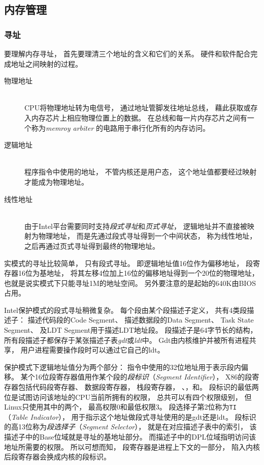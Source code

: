 \subsection{内存管理}

\subsubsection{寻址}
要理解内存寻址，
首先要理清三个地址的含义和它们的关系。
硬件和软件配合完成地址之间映射的过程。
\begin{description}
\item[物理地址] \hfill\\
  CPU将物理地址转为电信号，
  通过地址管脚发往地址总线，
  藉此获取或存入内存芯片上相应物理位置上的数据。
  在总线和每一片内存芯片之间有一个称为{\em memroy arbiter}
  的电路用于串行化所有的内存访问。
\item[逻辑地址] \hfill\\
  程序指令中使用的地址，
  不管内核还是用户态，
  这个地址值都要经过映射才能成为物理地址。
\item[线性地址] \hfill\\
  由于Intel平台需要同时支持{\em 段式寻址}和{\em 页式寻址}，
  逻辑地址并不直接被映射为物理地址，
  而是先通过段式寻址得到一个中间状态，
  称为线性地址，
  之后再通过页式寻址得到最终的物理地址。
\end{description}
实模式的寻址比较简单，
只有段式寻址。
即逻辑地址值16位作为偏移地址，
段寄存器16位为基地址，
将其左移4位加上16位的偏移地址得到一个20位的物理地址，
也就是说实模式下只能寻址1M的地址空间。
另外要注意的是起始的640K由BIOS占用。

Intel保护模式的段式寻址稍微复杂。
每个段由某个段描述子定义，
共有4类段描述子：
描述代码段的Code Segment、
描述数据段的Data Segment、
Task State Segment、
及LDT Segment用于描述LDT地址段。
段描述子是64字节长的结构，
所有段描述子都保存于某张描述子表{\em gdt}或{\em ldt}中。
Gdt由内核维护并被所有进程共享，
用户进程需要操作段时可以通过它自己的ldt。

保护模式下逻辑地址值分为两个部分：
指令中使用的32位地址用于表示段内偏移。
某个16位段寄存器值用作某个段的{\em 段标识}（{\em Segment Identifier}），
X86的段寄存器包括代码段寄存器、
数据段寄存器，
栈段寄存器，
、，和。
段标识的最低两位是试图访问该地址的CPU当前所拥有的权限，
总共可以有四个权限级别，
但Linux只使用其中的两个，
最高权限0和最低权限3。
段选择子第2位称为\verb|TI|（{\em Table Indicator}），
用于指示这个地址做段式寻址使用的是gdt还是ldt。
段标识的高13位称为{\em 段选择子}（{\em Segment Selector}），
就是在对应描述子表中的索引，
该描述子中的Base位域就是寻址的基地址部分。
而描述子中的DPL位域指明访问该地址所需要的权限。
所以可想而知，
段寄存器是进程上下文的一部分，
陷入内核后段寄存器会换成内核的段标识。

